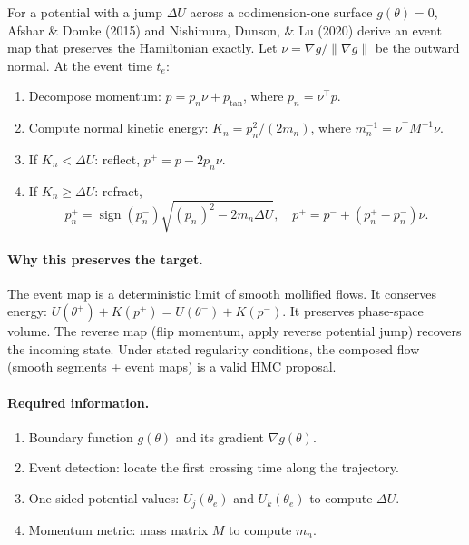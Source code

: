For a potential with a jump $\Delta U$ across a codimension-one surface
$g(\theta) = 0$, Afshar \& Domke (2015) and Nishimura, Dunson, \& Lu (2020)
derive an event map that preserves the Hamiltonian exactly. Let $\nu = \nabla
g / \|\nabla g\|$ be the outward normal. At the event time $t_e$:
\begin{enumerate}
  \item Decompose momentum: $p = p_n \nu + p_{\text{tan}}$, where
    $p_n = \nu^\top p$.
  \item Compute normal kinetic energy:
    $K_n = p_n^2 / (2 m_n)$, where $m_n^{-1} = \nu^\top M^{-1} \nu$.
  \item If $K_n < \Delta U$: reflect, $p^+ = p - 2 p_n \nu$.
  \item If $K_n \geq \Delta U$: refract,
    \begin{equation}
      p_n^+ = \operatorname{sign}(p_n^-) \sqrt{(p_n^-)^2 - 2 m_n \Delta U},
      \quad
      p^+ = p^- + (p_n^+ - p_n^-) \nu.
      \label{eq:refraction-rule}
    \end{equation}
\end{enumerate}

\paragraph{Why this preserves the target.}
The event map is a deterministic limit of smooth mollified flows. It conserves
energy: $U(\theta^+) + K(p^+) = U(\theta^-) + K(p^-)$. It preserves
phase-space volume. The reverse map (flip momentum, apply reverse potential
jump) recovers the incoming state. Under stated regularity conditions, the
composed flow (smooth segments + event maps) is a valid HMC proposal.

\paragraph{Required information.}
\begin{enumerate}
  \item Boundary function $g(\theta)$ and its gradient $\nabla g(\theta)$.
  \item Event detection: locate the first crossing time along the trajectory.
  \item One-sided potential values: $U_j(\theta_e)$ and $U_k(\theta_e)$ to
    compute $\Delta U$.
  \item Momentum metric: mass matrix $M$ to compute $m_n$.
\end{enumerate}

